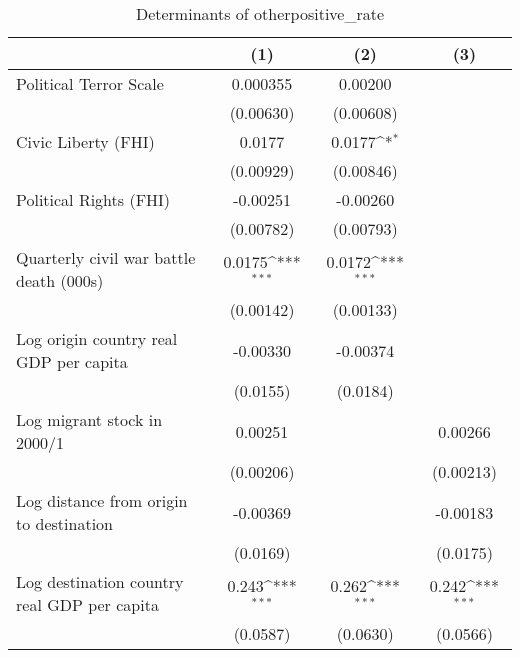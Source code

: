 \begin{table}[htbp]\centering
\def\sym#1{\ifmmode^{#1}\else\(^{#1}\)\fi}
\caption{Determinants of otherpositive\_rate}
\begin{tabular}{l*{3}{c}}
\hline\hline
                    &\multicolumn{1}{c}{(1)}         &\multicolumn{1}{c}{(2)}         &\multicolumn{1}{c}{(3)}         \\
\hline
Political Terror Scale&    0.000355         &     0.00200         &                     \\
                    &   (0.00630)         &   (0.00608)         &                     \\
[1em]
Civic Liberty (FHI) &      0.0177         &      0.0177\sym{*}  &                     \\
                    &   (0.00929)         &   (0.00846)         &                     \\
[1em]
Political Rights (FHI)&    -0.00251         &    -0.00260         &                     \\
                    &   (0.00782)         &   (0.00793)         &                     \\
[1em]
Quarterly civil war battle death (000s)&      0.0175\sym{***}&      0.0172\sym{***}&                     \\
                    &   (0.00142)         &   (0.00133)         &                     \\
[1em]
Log origin country real GDP per capita&    -0.00330         &    -0.00374         &                     \\
                    &    (0.0155)         &    (0.0184)         &                     \\
[1em]
Log migrant stock in 2000/1&     0.00251         &                     &     0.00266         \\
                    &   (0.00206)         &                     &   (0.00213)         \\
[1em]
Log distance from origin to destination&    -0.00369         &                     &    -0.00183         \\
                    &    (0.0169)         &                     &    (0.0175)         \\
[1em]
Log destination country real GDP per capita&       0.243\sym{***}&       0.262\sym{***}&       0.242\sym{***}\\
                    &    (0.0587)         &    (0.0630)         &    (0.0566)         \\

\end{tabular}
\end{table}
